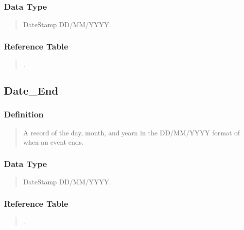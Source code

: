 \documentclass[letterpaper,10pt,english]{sphinxmanual}
\begin{document}
\subsubsection{Data Type}
\label{\detokenize{schema_tables:id41}}\begin{quote}

\sphinxAtStartPar
DateStamp DD/MM/YYYY.
\end{quote}


\subsubsection{Reference Table}
\label{\detokenize{schema_tables:id42}}\begin{quote}

\sphinxAtStartPar
{\hyperref[\detokenize{schema_tables:overview-table}]{}}.
\end{quote}


\subsection{Date\_End}
\label{\detokenize{schema_tables:date-end}}

\subsubsection{Definition}
\label{\detokenize{schema_tables:id43}}\begin{quote}

\sphinxAtStartPar
A record of the day, month, and yearn in the DD/MM/YYYY format of when an event ends.
\end{quote}


\subsubsection{Data Type}
\label{\detokenize{schema_tables:id44}}\begin{quote}

\sphinxAtStartPar
DateStamp DD/MM/YYYY.
\end{quote}


\subsubsection{Reference Table}
\label{\detokenize{schema_tables:id45}}\begin{quote}

\sphinxAtStartPar
{\hyperref[\detokenize{schema_tables:overview-table}]{}}.
\end{quote}
\end{document}
